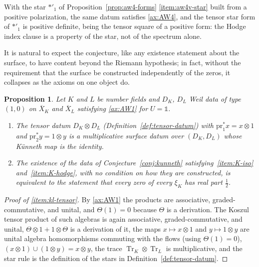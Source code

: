 \documentclass[11pt]{amsart}
\theoremstyle{plain}
\newtheorem{proposition}[theorem]{Proposition}
\theoremstyle{definition}
\theoremstyle{remark}
\numberwithin{equation}{section}
\newcommand{\Xbar}{\overline{X}}
\DeclareMathOperator{\Tr}{Tr}
\begin{document}
With the star $*'_1$ of Proposition~\ref{prop:aw4-forms}%
\ref{item:aw4v-star} built from a positive polarization, the same
datum satisfies \ref{ax:AW4}, and the tensor star form of $*'_1$ is
positive definite, being the tensor square of a positive form: the
Hodge index clause is a property of the star, not of the spectrum
alone.

It is natural to expect the conjecture, like any existence statement
about the surface, to have content beyond the Riemann hypothesis; in
fact, without the requirement that the surface be constructed
independently of the zeros, it collapses as the axioms on one object do.

\begin{proposition}\label{prop:kun-collapse}
Let $K$ and $L$ be number fields and $D_K$, $D_L$ Weil data of type
$(1,0)$ on $\Xbar_K$ and $\Xbar_L$ satisfying \ref{ax:AW1} for
$U=\mathbb 1$.
\begin{enumerate}[label=(\roman*)]
\item\label{item:kl-tensor} The tensor datum $D_K\otimes D_L$
  (Definition~\ref{def:tensor-datum}) with $\mathrm{pr}_1^*x=x\otimes1$
  and $\mathrm{pr}_2^*y=1\otimes y$ is a multiplicative surface datum
  over $(D_K,D_L)$ whose K\"unneth map is the identity.
\item\label{item:kl-iff} The existence of the data of
  Conjecture~\ref{conj:kunneth} satisfying~\ref{item:K-iso}
  and~\ref{item:K-hodge}, with no condition on how they are
  constructed, is equivalent to the statement that every zero of every
  $\xi_K$ has real part $\tfrac12$.
\end{enumerate}
\end{proposition}

\begin{proof}[Proof of \ref{item:kl-tensor}]
By \ref{ax:AW1} the products are associative, graded-commutative, and
unital, and $\Theta(1)=0$ because $\Theta$ is a derivation. The Koszul
tensor product of such algebras is again associative, graded-commutative,
and unital, $\Theta\otimes1+1\otimes\Theta$ is a derivation of it, the
maps $x\mapsto x\otimes1$ and $y\mapsto1\otimes y$ are unital algebra
homomorphisms commuting with the flows (using $\Theta(1)=0$),
$(x\otimes1)\cup(1\otimes y)=x\otimes y$, the trace
$\Tr_K\otimes\Tr_L$ is multiplicative, and the star rule is the
definition of the stars in Definition~\ref{def:tensor-datum}.
\end{proof}
\end{document}
